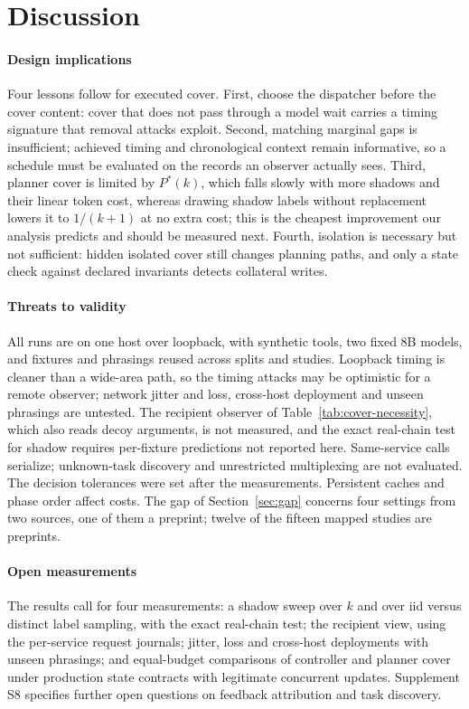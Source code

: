 \section{Discussion}\label{sec:discussion}
\paragraph{Design implications}
Four lessons follow for executed cover. First, choose the dispatcher before the cover content: cover that does not pass through a model wait carries a timing signature that removal attacks exploit. Second, matching marginal gaps is insufficient; achieved timing and chronological context remain informative, so a schedule must be evaluated on the records an observer actually sees. Third, planner cover is limited by $P^*(k)$, which falls slowly with more shadows and their linear token cost, whereas drawing shadow labels without replacement lowers it to $1/(k+1)$ at no extra cost; this is the cheapest improvement our analysis predicts and should be measured next. Fourth, isolation is necessary but not sufficient: hidden isolated cover still changes planning paths, and only a state check against declared invariants detects collateral writes.

\paragraph{Threats to validity}\label{sec:limits}
All runs are on one host over loopback, with synthetic tools, two fixed 8B models, and fixtures and phrasings reused across splits and studies. Loopback timing is cleaner than a wide-area path, so the timing attacks may be optimistic for a remote observer; network jitter and loss, cross-host deployment and unseen phrasings are untested. The recipient observer of Table~\ref{tab:cover-necessity}, which also reads decoy arguments, is not measured, and the exact real-chain test for shadow requires per-fixture predictions not reported here. Same-service calls serialize; unknown-task discovery and unrestricted multiplexing are not evaluated. The decision tolerances were set after the measurements. Persistent caches and phase order affect costs. The gap of Section~\ref{sec:gap} concerns four settings from two sources, one of them a preprint; twelve of the fifteen mapped studies are preprints.

\paragraph{Open measurements}
The results call for four measurements: a shadow sweep over $k$ and over iid versus distinct label sampling, with the exact real-chain test; the recipient view, using the per-service request journals; jitter, loss and cross-host deployments with unseen phrasings; and equal-budget comparisons of controller and planner cover under production state contracts with legitimate concurrent updates. Supplement S8 specifies further open questions on feedback attribution and task discovery.

